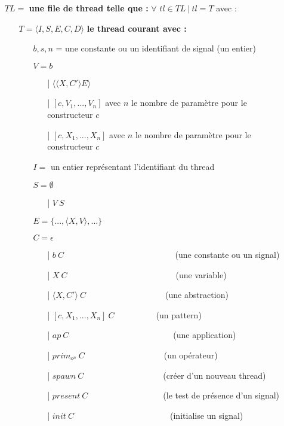 \documentclass[10pt,a4paper]{report}
\begin{document}
	\begin{itemize}
		\item[] $TL =$ \textbf{une file de thread telle que :} $\forall$ $tl \in TL~|~tl = T$ avec :
		\begin{itemize}
			\item[] $T = \langle I,S,E,C,D\rangle$ \textbf{le thread courant avec :}
			\begin{itemize}
				\item[] $b,s,n$ = une constante ou un identifiant de signal (un entier)
				\item[] $V = b$	
				\begin{itemize}
					\item[|] $\langle\langle X,C' \rangle E\rangle$
					\item[|] $[c,V_{1},...,V_{n}]$ avec $n$ le nombre de paramètre pour le constructeur $c$
					\item[|] $[c,X_{1},...,X_{n}]$ avec $n$ le nombre de paramètre pour le constructeur $c$
				\end{itemize}
				\item[] $I =$ un entier représentant l'identifiant du thread
				\item[] $S =  \emptyset$ 
				\begin{itemize}
					\item[|] $V~S$
				\end{itemize}
				\item[] $E = \{...,\langle X,V\rangle,...\}$
				\item[] $C = \epsilon$
				\begin{itemize}
					\item[|] $b~C$~~~~~~~~~~~~~~~~~~~~~~~~~~ (une constante ou un signal)
					\item[|] $X~C$~~~~~~~~~~~~~~~~~~~~~~~~~~(une variable)
					\item[|] $\langle X,C'\rangle~C$~~~~~~~~~~~~~~~~~~~(une abstraction)
					\item[|] $[c,X_{1},...,X_{n}]~C$~~~~~~~~~~(un pattern)
					\item[|] $ap~C$~~~~~~~~~~~~~~~~~~~~~~~~~(une application)
					\item[|] $prim_{o^{n}}~C$~~~~~~~~~~~~~~~~~~~(un opérateur)
					\item[|] $spawn~C$~~~~~~~~~~~~~~~~~~~(créer d'un nouveau thread)
					\item[|] $present~C$~~~~~~~~~~~~~~~~~~(le test de présence d'un signal)
					\item[|] $init~C$~~~~~~~~~~~~~~~~~~~~~~~(initialise un signal)

\end{itemize}
\end{itemize}
\end{itemize}
\end{itemize}
\end{document}
